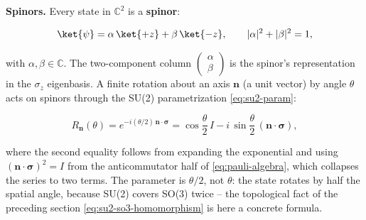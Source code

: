 \medskip\noindent\textbf{Spinors.} Every state in $\mathbb{C}^2$ is a \textbf{spinor}:
\begin{linenomath}
  \begin{equation}
    \ket{\psi} = \alpha\,\ket{+z} + \beta\,\ket{-z},
    \qquad
    |\alpha|^2 + |\beta|^2 = 1,
  \end{equation}
\end{linenomath}
with $\alpha,\beta\in\mathbb{C}$. The two-component column $\begin{pmatrix}\alpha\\\beta\end{pmatrix}$ is the spinor's representation in the $\sigma_z$ eigenbasis. A finite rotation about an axis $\bm n$ (a unit vector) by angle $\theta$ acts on spinors through the SU(2) parametrization \eqref{eq:su2-param}:
\begin{linenomath}
  \begin{equation}
    R_{\bm n}(\theta) = e^{-i(\theta/2)\,\bm n\cdot\bm\sigma}
    = \cos\frac{\theta}{2}\,I - i\,\sin\frac{\theta}{2}\,(\bm n\cdot\bm\sigma),
  \end{equation}
\end{linenomath}
where the second equality follows from expanding the exponential and using $(\bm n\cdot\bm\sigma)^2 = I$ from the anticommutator half of \eqref{eq:pauli-algebra}, which collapses the series to two terms. The parameter is $\theta/2$, not $\theta$: the state rotates by half the spatial angle, because SU(2) covers SO(3) twice -- the topological fact of the preceding section \eqref{eq:su2-so3-homomorphism} is here a concrete formula.


